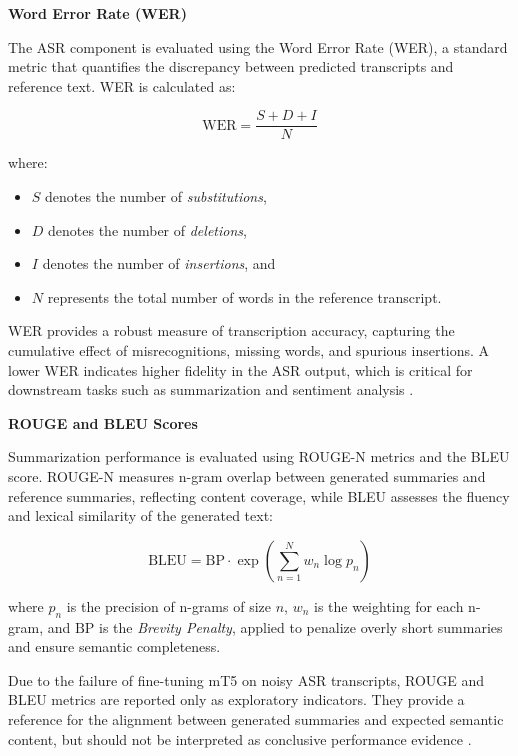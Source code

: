 \textbf{Word Error Rate (WER)}

The ASR component is evaluated using the Word Error Rate (WER), a standard metric that quantifies the discrepancy between predicted transcripts and reference text. WER is calculated as:

\begin{equation}
    \text{WER} = \frac{S + D + I}{N}
\end{equation}

where:
\begin{itemize}
    \item $S$ denotes the number of \textit{substitutions},
    \item $D$ denotes the number of \textit{deletions},
    \item $I$ denotes the number of \textit{insertions}, and
    \item $N$ represents the total number of words in the reference transcript.
\end{itemize}

WER provides a robust measure of transcription accuracy, capturing the cumulative effect of misrecognitions, missing words, and spurious insertions. A lower WER indicates higher fidelity in the ASR output, which is critical for downstream tasks such as summarization and sentiment analysis \citep{DHAHBI2025100615}.

\textbf{ROUGE and BLEU Scores}

Summarization performance is evaluated using ROUGE-N metrics and the BLEU score. ROUGE-N measures n-gram overlap between generated summaries and reference summaries, reflecting content coverage, while BLEU assesses the fluency and lexical similarity of the generated text:

\begin{equation}
    \text{BLEU} = \text{BP} \cdot \exp\left(\sum_{n=1}^{N} w_n \log p_n\right)
\end{equation}

where $p_n$ is the precision of n-grams of size $n$, $w_n$ is the weighting for each n-gram, and $\text{BP}$ is the \textit{Brevity Penalty}, applied to penalize overly short summaries and ensure semantic completeness.

Due to the failure of fine-tuning mT5 on noisy ASR transcripts, ROUGE and BLEU metrics are reported only as exploratory indicators. They provide a reference for the alignment between generated summaries and expected semantic content, but should not be interpreted as conclusive performance evidence \citep{DHAHBI2025100615}.

